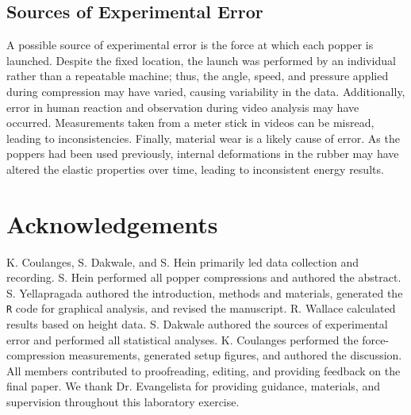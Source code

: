 \documentclass[amsmath,amssymb,aps,endfloats,linenumbers]{revtex4-2}
\begin{document}
\subsection{Sources of Experimental Error}
A possible source of experimental error is the force at which each popper is launched. Despite the fixed location, the launch was performed by an individual rather than a repeatable machine; thus, the angle, speed, and pressure applied during compression may have varied, causing variability in the data. Additionally, error in human reaction and observation during video analysis may have occurred. Measurements taken from a meter stick in videos can be misread, leading to inconsistencies. Finally, material wear is a likely cause of error. As the poppers had been used previously, internal deformations in the rubber may have altered the elastic properties over time, leading to inconsistent energy results.

\section{Acknowledgements}
K. Coulanges, S. Dakwale, and S. Hein primarily led data collection and recording. S. Hein performed all popper compressions and authored the abstract. S. Yellapragada authored the introduction, methods and materials, generated the \texttt{R} code for graphical analysis, and revised the manuscript. R. Wallace calculated results based on height data. S. Dakwale authored the sources of experimental error and performed all statistical analyses. K. Coulanges performed the force-compression measurements, generated setup figures, and authored the discussion. All members contributed to proofreading, editing, and providing feedback on the final paper. We thank Dr. Evangelista for providing guidance, materials, and supervision throughout this laboratory exercise.


\end{document}
